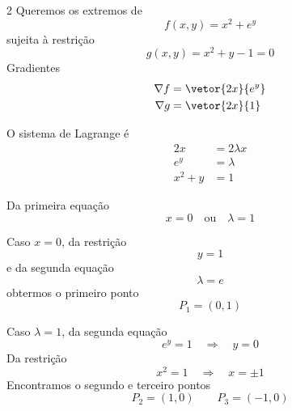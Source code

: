 \documentclass[a4paper,12pt,fleqn]{article}
\begin{document}
\begin{answer}
\begin{multicols}{2}
Queremos os extremos de
\[
  f(x, y) = x^2 + e^{y}
\]
sujeita à restrição
\[
  g(x, y) = x^2 + y - 1 = 0
\]
Gradientes
\begin{align*}
  \nabla f & = \vetor{2x}{e^{y}} \\
  \nabla g & = \vetor{2x}{1}
\end{align*}

O sistema de Lagrange é
\begin{align*}
  2x    & =2\lambda x \\
  e^{y} & =\lambda    \\
  x^2+y & =1
\end{align*}

Da primeira equação
\[
  x = 0 \quad \text{ou} \quad \lambda=1
\]

Caso $x=0$, da restrição
\[
  y = 1
\]
e da segunda equação
\[
  \lambda = e
\]
obtermos o primeiro ponto
\[
  P_1 = (0, 1)
\]

Caso $\lambda=1$, da segunda equação
\[
  e^{y}=1 \quad\Rightarrow\quad y=0
\]
Da restrição
\[
x^2=1 \quad\Rightarrow\quad x=\pm1
\]
Encontramos o segundo e terceiro pontos
\[
P_2 = (1, 0) \qquad P_3 = (-1, 0)
\]
\end{multicols}
\end{answer}

\end{document}
